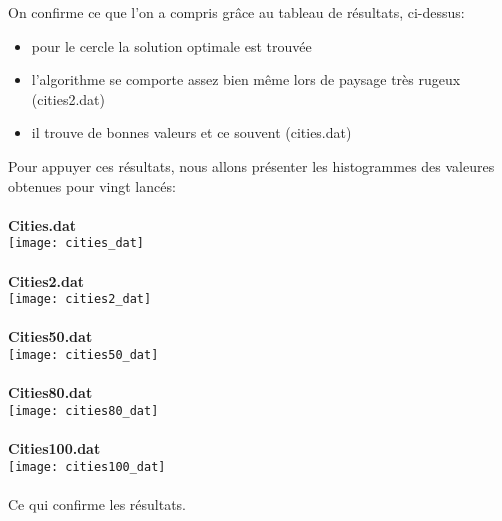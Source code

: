 \documentclass[a4paper, 11pt]{article}
\begin{document}
On confirme ce que l'on a compris grâce au tableau de résultats, ci-dessus:
\begin{itemize}
 \item pour le cercle la solution optimale est trouvée
 \item l'algorithme se comporte assez bien même lors de paysage très rugeux (cities2.dat)
 \item il trouve de bonnes valeurs et ce souvent (cities.dat)
\end{itemize}

Pour appuyer ces résultats, nous allons présenter les histogrammes des valeures obtenues pour vingt lancés:\\

\paragraph{}
\textbf{Cities.dat}\\
\texttt{[image: cities\_dat]}\\
\paragraph{}\textbf{Cities2.dat}\\
\texttt{[image: cities2\_dat]}\\
\paragraph{}\textbf{Cities50.dat}\\
\texttt{[image: cities50\_dat]}\\
\paragraph{}\textbf{Cities80.dat}\\
\texttt{[image: cities80\_dat]}\\
\paragraph{}\textbf{Cities100.dat}\\
\texttt{[image: cities100\_dat]}\\

\paragraph{}Ce qui confirme les résultats.
\end{document}
